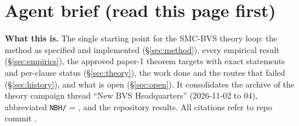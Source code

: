 \section*{Agent brief (read this page first)}\label{sec:brief}

\textbf{What this is.} The single starting point for the SMC-BVS theory loop: the method as specified and implemented (\S\ref{sec:method}), every empirical result (\S\ref{sec:empirics}), the approved paper-1 theorem targets with exact statements and per-clause status (\S\ref{sec:theory}), the work done and the routes that failed (\S\ref{sec:history}), and what is open (\S\ref{sec:open}). It consolidates the archive of the theory campaign thread ``New BVS Headquarters'' (2026-11-02 to 04), abbreviated \texttt{NBH/} = , and the repository results. All citations refer to repo commit \texttt{\sourcecommit}.

